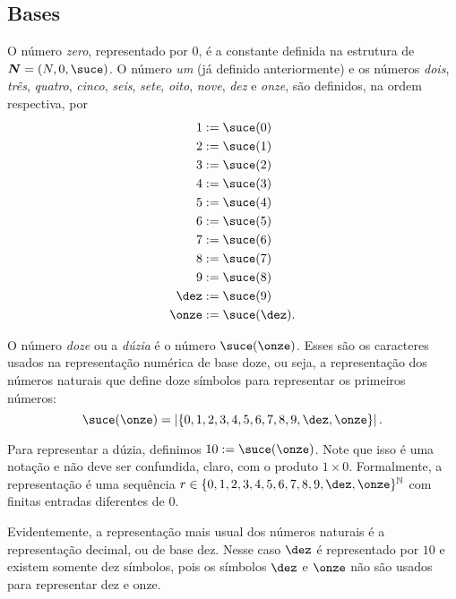 \cleardoublepage
\subsection{Bases}

O número \emph{zero}, representado por $0$, é a constante definida na estrutura de $\bm N = (N,0,\suce)$. O número \emph{um} (já definido anteriormente) e os números \emph{dois}, \emph{três}, \emph{quatro}, \emph{cinco}, \emph{seis}, \emph{sete}, \emph{oito}, \emph{nove}, \emph{dez} e \emph{onze}, são definidos, na ordem respectiva, por
	\begin{align*}
	1 &:= \suce(0) \\
	2 &:= \suce(1) \\
	3 &:= \suce(2) \\
	4 &:= \suce(3) \\
	5 &:= \suce(4) \\
	6 &:= \suce(5) \\
	7 &:= \suce(6) \\
	8 &:= \suce(7) \\
	9 &:= \suce(8) \\
	\dez &:= \suce(9) \\
	\onze &:= \suce(\dez).
	\end{align*}


O número \emph{doze} ou a \emph{dúzia} é o número $\suce(\onze)$. Esses são os caracteres usados na representação numérica de base doze, ou seja, a representação dos números naturais que define doze símbolos para representar os primeiros números:
	\begin{equation*}
	\suce(\onze) = \card{\{0,1,2,3,4,5,6,7,8,9,\dez,\onze\}}.
	\end{equation*}

Para representar a dúzia, definimos $10 := \suce(\onze)$. Note que isso é uma notação e não deve ser confundida, claro, com o produto $1 \times 0$. Formalmente, a representação é uma sequência $r \in \{0,1,2,3,4,5,6,7,8,9,\dez,\onze\}^\N$ com finitas entradas diferentes de $0$.

Evidentemente, a representação mais usual dos números naturais é a representação decimal, ou de base dez. Nesse caso $\dez$ é representado por $10$ e existem somente dez símbolos, pois os símbolos $\dez$ e $\onze$ não são usados para representar dez e onze.




















